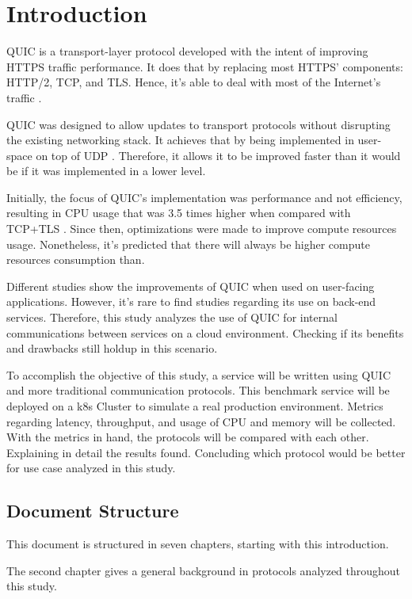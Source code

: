 \section{Introduction}

QUIC is a transport-layer protocol developed with the intent of improving HTTPS traffic performance. It does that by replacing most HTTPS' components: HTTP/2, TCP, and TLS. Hence, it's able to deal with most of the Internet's traffic \cite{rfc9000}.

QUIC was designed to allow updates to transport protocols without disrupting the existing networking stack. It achieves that by being implemented in user-space on top of UDP \cite{rfc9000}. Therefore, it allows it to be improved faster than it would be if it was implemented in a lower level.

Initially, the focus of QUIC's implementation was performance and not efficiency, resulting in CPU usage that was 3.5 times higher when compared with TCP+TLS \cite{quic_protocol}. Since then, optimizations were made to improve compute resources usage. Nonetheless, it's predicted that there will always be higher compute resources consumption than.

Different studies show the improvements of QUIC when used on user-facing applications. However, it's rare to find studies regarding its use on back-end services. Therefore, this study analyzes the use of QUIC for internal communications between services on a cloud environment. Checking if its benefits and drawbacks still holdup in this scenario.

To accomplish the objective of this study, a service will be written using QUIC and more traditional communication protocols. This benchmark service will be deployed on a \gls{k8s} Cluster to simulate a real production environment. Metrics regarding latency, throughput, and usage of CPU and memory will be collected. 
With the metrics in hand, the protocols will be compared with each other. Explaining in detail the results found. Concluding which protocol would be better for use case analyzed in this study.

\subsection{Document Structure}

This document is structured in seven chapters, starting with this introduction. 

The second chapter gives a general background in protocols analyzed throughout this study.

